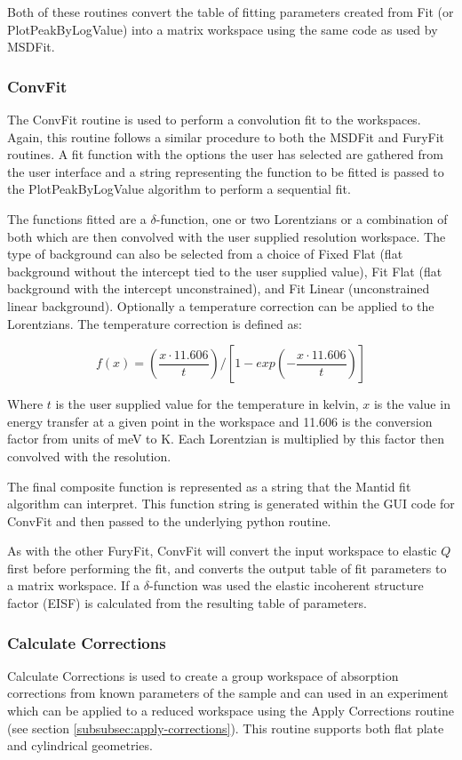 \documentclass[paper=a4, fontsize=11pt]{scrartcl}	%
\numberwithin{equation}{section}															%
\numberwithin{figure}{section}																%
\numberwithin{table}{section}																%
\begin{document}
Both of these routines convert the table of fitting parameters created from Fit (or PlotPeakByLogValue) into a matrix workspace using the same code as used by MSDFit.

\subsubsection{ConvFit}
\label{subsubsec:convfit}
The ConvFit routine is used to perform a convolution fit to the workspaces. Again, this routine follows a similar procedure to both the MSDFit and FuryFit routines. A fit function with the options the user has selected are gathered from the user interface and a string representing the function to be fitted is passed to the PlotPeakByLogValue algorithm to perform a sequential fit.

The functions fitted are a $\delta$-function, one or two Lorentzians or a combination of both which are then convolved with the user supplied resolution workspace. The type of background can also be selected from a choice of Fixed Flat (flat background without the intercept tied to the user supplied value), Fit Flat (flat background with the intercept unconstrained), and Fit Linear (unconstrained linear background). Optionally a temperature correction can be applied to the Lorentzians. The temperature correction is defined as:

\begin{equation}
f(x) = (\frac{x \cdot 11.606}{t}) / [1 - exp(-\frac{x \cdot 11.606}{t})]
\end{equation}

Where $t$ is the user supplied value for the temperature in kelvin, $x$ is the value in energy transfer at a given point in the workspace and 11.606 is the conversion factor from units of meV to K. Each Lorentzian is multiplied by this factor then convolved with the resolution.

The final composite function is represented as a string that the Mantid fit algorithm can interpret. This function string is generated within the GUI code for ConvFit and then passed to the underlying python routine.

As with the other FuryFit, ConvFit will convert the input workspace to elastic $Q$ first before performing the fit, and converts the output table of fit parameters to a matrix workspace. If a $\delta$-function was used the elastic incoherent structure factor (EISF) is calculated from the resulting table of parameters.

\subsubsection{Calculate Corrections}
Calculate Corrections is used to create a group workspace of absorption corrections from known parameters of the sample and can used in an experiment which can be applied to a reduced workspace using the Apply Corrections routine (see section \ref{subsubsec:apply-corrections}). This routine supports both flat plate and cylindrical geometries.
\end{document}
